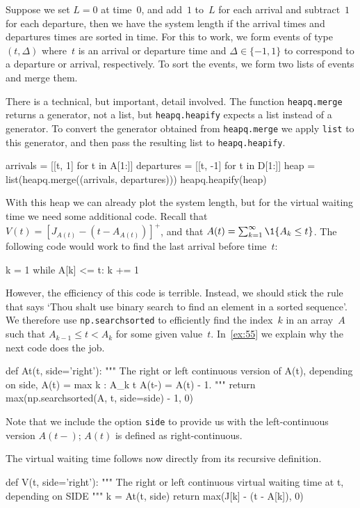 \documentclass[stochastic-or.tex]{subfiles}
\begin{document}
Suppose we set $L=0$ at time~$0$, and add~$1$ to~$L$ for each arrival and subtract~$1$ for each departure, then we have the system length if the arrival times and departures times are sorted in time.
For this to work, we form events of type $(t, \Delta)$ where~$t$ is an arrival or departure time and $\Delta \in \{-1, 1\}$ to correspond to a departure or arrival, respectively.
To sort the events, we form two lists of events and merge them.

There is a technical, but important, detail involved.
The function \texttt{heapq.merge} returns a generator, not a list, but \texttt{heapq.heapify} expects a list instead of a generator.
To convert the generator obtained from \texttt{heapq.merge} we apply \texttt{list} to this generator, and then pass the resulting list to \texttt{heapq.heapify}.
\begin{python}
arrivals = [[t, 1] for t in A[1:]]
departures = [[t, -1] for t in D[1:]]
heap = list(heapq.merge((arrivals, departures)))
heapq.heapify(heap)
\end{python}

With this heap we can already plot the system length, but for the virtual waiting time we need some additional code.
Recall that $V(t) = [J_{A(t)} - (t-A_{A(t)})]^{+}$, and that $A(t) = \sum_{k=1}^{\infty} \1{A_k\leq t}$. The following code would work to find the last arrival before time~$t$:
\begin{python}
k = 1
while A[k] <= t:
    k += 1
\end{python}
However, the efficiency of this code is terrible.
Instead, we should stick the rule that says `Thou shalt use binary search to find an element in a sorted sequence'.
We therefore use \texttt{np.searchsorted} to efficiently find the index~$k$ in an array~$A$ such that $A_{k-1} \leq t < A_{k}$ for some given value~$t$.
In~\cref{ex:55} we explain why the next code does the job.
\begin{python}
def At(t, side='right'):
    """
    The right or left continuous version of A(t), depending on side,
    A(t) = max {k : A_k \geq t}
    A(t-) = A(t) - 1.
    """
    return max(np.searchsorted(A, t, side=side) - 1, 0)
\end{python}
Note that we include the option \texttt{side} to provide us with the left-continuous version $A(t-)$; $A(t)$ is defined as right-continuous.

The virtual waiting time follows now directly from its recursive definition.
\begin{python}
def V(t, side='right'):
    """
    The right or left continuous virtual waiting time at t, depending on SIDE
    """
    k = At(t, side)
    return max(J[k] - (t - A[k]), 0)
\end{python}
\end{document}
